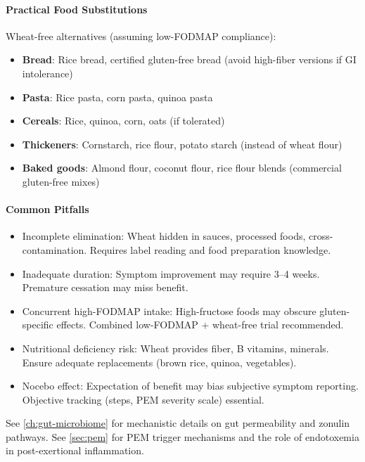 \paragraph{Practical Food Substitutions}

Wheat-free alternatives (assuming low-FODMAP compliance):

\begin{itemize}
    \item \textbf{Bread}: Rice bread, certified gluten-free bread (avoid high-fiber versions if GI intolerance)
    \item \textbf{Pasta}: Rice pasta, corn pasta, quinoa pasta
    \item \textbf{Cereals}: Rice, quinoa, corn, oats (if tolerated)
    \item \textbf{Thickeners}: Cornstarch, rice flour, potato starch (instead of wheat flour)
    \item \textbf{Baked goods}: Almond flour, coconut flour, rice flour blends (commercial gluten-free mixes)
\end{itemize}

\paragraph{Common Pitfalls}

\begin{itemize}
    \item Incomplete elimination: Wheat hidden in sauces, processed foods, cross-contamination. Requires label reading and food preparation knowledge.
    \item Inadequate duration: Symptom improvement may require 3--4 weeks. Premature cessation may miss benefit.
    \item Concurrent high-FODMAP intake: High-fructose foods may obscure gluten-specific effects. Combined low-FODMAP + wheat-free trial recommended.
    \item Nutritional deficiency risk: Wheat provides fiber, B vitamins, minerals. Ensure adequate replacements (brown rice, quinoa, vegetables).
    \item Nocebo effect: Expectation of benefit may bias subjective symptom reporting. Objective tracking (steps, PEM severity scale) essential.
\end{itemize}

See \cref{ch:gut-microbiome} for mechanistic details on gut permeability and zonulin pathways. See \cref{sec:pem} for PEM trigger mechanisms and the role of endotoxemia in post-exertional inflammation.

